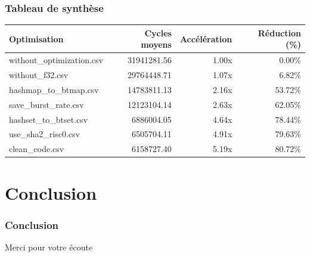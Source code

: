 \documentclass[aspectratio=169]{beamer}
\begin{document}
\begin{frame}
  \frametitle{Tableau de synthèse}
  \begin{center}
    \begin{table}[h!]
    \centering
    \begin{tabular}{|l|r|r|r|}
    \hline
    \textbf{Optimisation} & \textbf{Cycles moyens} & \textbf{Accélération} & \textbf{Réduction (\%)} \\
    \hline
    without\_optimization.csv & 31941281.56 & 1.00x & 0.00\% \\
    without\_f32.csv       & 29764448.71 & 1.07x & 6.82\%  \\
    hashmap\_to\_btmap.csv & 14783811.13 & 2.16x & 53.72\% \\
    save\_burst\_rate.csv  & 12123104.14 & 2.63x & 62.05\% \\
    hashset\_to\_btset.csv &  6886004.05 & 4.64x & 78.44\% \\
    use\_sha2\_risc0.csv   &  6505704.11 & 4.91x & 79.63\% \\
    clean\_code.csv        &  6158727.40 & 5.19x & 80.72\% \\
    \hline
    \end{tabular}
    \end{table}
  \end{center}
\end{frame}

\section{Conclusion}
\begin{frame}[plain]
    \frametitle{Conclusion}
    \centering
    {\Huge{Merci pour votre écoute}}
\end{frame}
\end{document}
